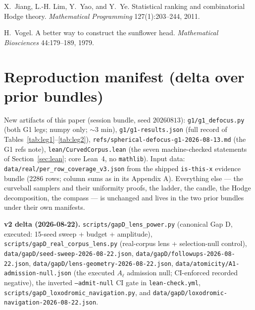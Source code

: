 \documentclass[11pt,a4paper]{article}
\theoremstyle{plain}
\theoremstyle{remark}
\begin{document}
\medskip\noindent X.~Jiang, L.-H. Lim, Y.~Yao, and Y.~Ye. Statistical ranking and combinatorial Hodge theory. \emph{Mathematical Programming} 127(1):203--244, 2011.

\medskip\noindent H.~Vogel. A better way to construct the sunflower head. \emph{Mathematical Biosciences} 44:179--189, 1979.

\appendix

\section{Reproduction manifest (delta over prior bundles)}
\label{app:manifest}

New artifacts of this paper (session bundle, seed $20260813$): \texttt{g1/g1\_defocus.py} (both G1 legs; numpy only; ${\sim}3$ min), \texttt{g1/g1-results.json} (full record of Tables~\ref{tab:leg1}--\ref{tab:leg2}), \texttt{refs/spherical-defocus-g1-2026-08-13.md} (the G1 refs note), \texttt{lean/CurvedCorpus.lean} (the seven machine-checked statements of Section~\ref{sec:lean}; core Lean~4, no \texttt{mathlib}). Input data: \texttt{data/real/per\_row\_coverage\_v3.json} from the shipped \texttt{is-this-x} evidence bundle (2286 rows; column sums as in its Appendix A). Everything else --- the curveball samplers and their uniformity proofs, the ladder, the candle, the Hodge decomposition, the compass --- is unchanged and lives in the two prior bundles under their own manifests.


\medskip\noindent \textbf{v2 delta (2026-08-22).} \texttt{scripts/gapD\_lens\_power.py} (canonical Gap D, executed: 15-seed sweep + budget + amplitude), \texttt{scripts/gapD\_real\_corpus\_lens.py} (real-corpus lens + selection-null control), \texttt{data/gapD/seed-sweep-2026-08-22.json}, \texttt{data/gapD/followups-2026-08-22.json}, \texttt{data/gapD/lens-geometry-2026-08-22.json}, \texttt{data/atomicity/A1-admission-null.json} (the executed $A_\ell$ admission null; CI-enforced recorded negative), the inverted \texttt{--admit-null} CI gate in \texttt{lean-check.yml}, \texttt{scripts/gapD\_loxodromic\_navigation.py}, and \texttt{data/gapD/loxodromic-navigation-2026-08-22.json}.
\end{document}
